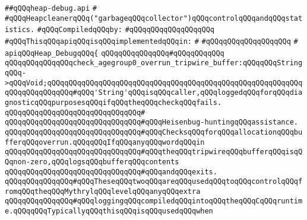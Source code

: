 \label{src/lib/std/src/nj/heap-debug.api}
\verb|##qQQqheap-debug.api|\newline
\verb|#|\newline
\verb|#qQQqHeapcleanerqQQq("garbageqQQqcollector")qQQqcontrolqQQqandqQQqstatistics.|\newline
\newline
\verb|#qQQqCompiledqQQqby:|\newline
\verb|#qQQqqQQqqQQqqQQqqQQq|\newline
\newline
\newline
\newline
\newline
\verb|#qQQqThisqQQqapiqQQqisqQQqimplementedqQQqin:|\newline
\verb|#|\newline
\verb|#qQQqqQQqqQQqqQQqqQQq|\newline
\verb|#|\newline
\verb|apiqQQqHeap_DebugqQQq{|\newline
\verb|qQQqqQQqqQQqqQQq#qQQqqQQqqQQq|\newline
\verb|qQQqqQQqqQQqqQQqcheck_agegroup0_overrun_tripwire_buffer:qQQqqQQqStringqQQq->qQQqVoid;qQQqqQQqqQQqqQQqqQQqqQQqqQQqqQQqqQQqqQQqqQQqqQQqqQQqqQQqqQQqqQQqqQQqqQQqqQQq#qQQq'String'qQQqisqQQqcaller,qQQqloggedqQQqforqQQqdiagnosticqQQqpurposesqQQqifqQQqtheqQQqcheckqQQqfails.|\newline
\verb|qQQqqQQqqQQqqQQqqQQqqQQqqQQqqQQq#|\newline
\verb|qQQqqQQqqQQqqQQqqQQqqQQqqQQqqQQq#qQQqHeisenbug-huntingqQQqassistance.|\newline
\verb|qQQqqQQqqQQqqQQqqQQqqQQqqQQqqQQq#qQQqChecksqQQqforqQQqallocationqQQqbufferqQQqoverrun.qQQqqQQqIfqQQqanyqQQqwordqQQqin|\newline
\verb|qQQqqQQqqQQqqQQqqQQqqQQqqQQqqQQq#qQQqtheqQQqtripwireqQQqbufferqQQqisqQQqnon-zero,qQQqlogsqQQqbufferqQQqcontents|\newline
\verb|qQQqqQQqqQQqqQQqqQQqqQQqqQQqqQQq#qQQqandqQQqexits.|\newline
\newline
\verb|qQQqqQQqqQQqqQQq#qQQqTheseqQQqtwoqQQqareqQQqusedqQQqtoqQQqcontrolqQQqfromqQQqtheqQQqMythrylqQQqlevelqQQqanyqQQqextra|\newline
\verb|qQQqqQQqqQQqqQQq#qQQqloggingqQQqcompiledqQQqintoqQQqtheqQQqCqQQqruntime.qQQqqQQqTypicallyqQQqthisqQQqisqQQqusedqQQqwhen|\newline
